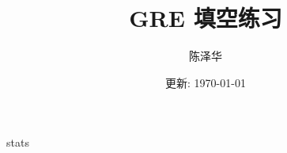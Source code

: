\documentclass{report}
\title{GRE 填空练习}
\author{陈泽华}
\date{更新: \today}
\begin{document}
  \maketitle
  \tableofcontents

  {stats}
\end{document}
